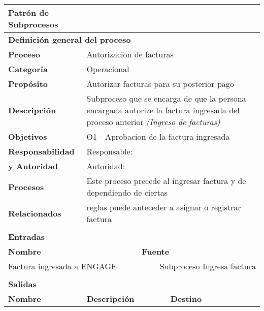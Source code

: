 \begin{longtable}{|llrrrrrr|}
	\hline
	\multicolumn{2}{|l|}{\textbf{Patrón de Subprocesos}} & \multicolumn{6}{|l|}{\textit{}} \\ \hline
	\multicolumn{8}{|l|}{\textbf{Definición general del proceso}} \\ \hline
	\textbf{Proceso} & \multicolumn{7}{|m{12cm}|}{Autorizacion de facturas} \\ \hline
	\textbf{Categoría} & \multicolumn{7}{|m{12cm}|}{Operacional} \\ \hline
	\textbf{Propósito} & \multicolumn{7}{|m{12cm}|}{Autorizar facturas para su posterior pago} \\ \hline
    \textbf{Descripción} & \multicolumn{7}{|m{12cm}|}{Subproceso que se encarga de que la persona encargada autorize la factura ingresada del proceso anterior \textit{(Ingreso de facturas)}} \\ \hline
	\multirow{0}[6]{*}{\textbf{Objetivos}} 
          & \multicolumn{7}{|l|}{O1 -  Aprobacion de la factura ingresada} \\ \hline
    \multicolumn{1}{|l|}{\textbf{Responsabilidad}} 	& \multicolumn{7}{|l|}{Responsable: } \\
	\multicolumn{1}{|l|}{\textbf{y Autoridad}} 	& \multicolumn{7}{|l|}{Autoridad: } \\ \hline
    \multicolumn{1}{|l|}{\textbf{Procesos}} 	& \multicolumn{7}{|m{12cm}|}{Este proceso precede al ingresar factura y de dependiendo de ciertas } \\
	\multicolumn{1}{|l|}{\textbf{Relacionados}} 	&  \multicolumn{7}{|m{12cm}|}{reglas puede anteceder a asignar o registrar factura} \\ \hline
          &       &       &       &       &       &       &  \\ \hline
    \multicolumn{8}{|l|}{\textbf{Entradas}} \\ \hline
    \multicolumn{5}{|l|}{\textbf{Nombre}}   & \multicolumn{3}{|l|}{\textbf{Fuente}} \\ \hline
    \multicolumn{5}{|l|}{Factura ingresada a ENGAGE} & \multicolumn{3}{|m{3.5cm}|}{Subproceso Ingresa factura} \\  \hline
       &       &       &       &       &       &       &  \\ \hline
    \multicolumn{8}{|l|}{\textbf{Salidas}} \\ \hline
    \textbf{Nombre} & \multicolumn{5}{|l|}{\textbf{Descripción}} & \multicolumn{2}{|l|}{\textbf{Destino}} \\ \hline

\end{longtable}
